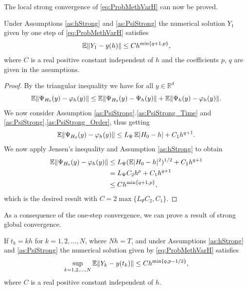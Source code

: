 \documentclass{siamart1116}
\numberwithin{theorem}{section}
\DeclarePairedDelimiter{\abs}{\lvert}{\rvert}
\DeclarePairedDelimiter{\norm}{\|}{\|}
\renewcommand{\phi}{\varphi}
\newcommand{\R}{\mathbb{R}}
\newcommand{\E}{\operatorname{\mathbb{E}}}
\begin{document}
The local strong convergence of \eqref{eq:ProbMethVarH} can now be proved. 
\begin{theorem}\label{thm:StrongOrderLocal} Under Assumptions \ref{as:hStrong} and \ref{as:PsiStrong} the numerical solution $Y_1$ given by one step of \eqref{eq:ProbMethVarH} satisfies 
	\begin{equation}
	\E\norm{Y_1 - y(h)} \leq C h^{\min\{q + 1, p\}},
	\end{equation}
	where $C$ is a real positive constant independent of $h$ and the coefficients $p$, $q$ are given in the assumptions.
\end{theorem}
\begin{proof} By the triangular inequality we have for all $y \in \R^d$ 
	\begin{equation}
		\E\norm{\Psi_{H_0}(y) - \phi_h(y)} \leq \E\norm{\Psi_{H_0}(y) - \Psi_h(y)} + \E\norm{\Psi_h(y) - \phi_h(y)}.
	\end{equation}		
	We now consider Assumption \ref{as:PsiStrong}.\ref{as:PsiStrong_Time} and \ref{as:PsiStrong}.\ref{as:PsiStrong_Order}, thus getting
	\begin{equation}\label{eq:LocalErrorDecomposition}
		\E\norm{\Psi_{H_0}(y) - \phi_h(y)} \leq L_{\Psi} \E\abs{H_0 - h} + C_1 h^{q+1}.
	\end{equation}
	We now apply Jensen's inequality and Assumption \ref{as:hStrong} to obtain
	\begin{equation}
	\begin{aligned}
		\E\norm{\Psi_{H_0}(y) - \phi_h(y)} & \leq L_{\Psi} (\E\abs{H_0 - h}^{2})^{1/2} + C_1 h^{q+1}\\
		&= L_{\Psi}C_2 h^p + C_1 h^{q+1} \\
		&\leq C h^{\min\{q+1, p\}},
	\end{aligned}
	\end{equation}
	which is the desired result with $C = 2\max\{L_\Psi C_2, C_1\}$.
\end{proof}
As a consequence of the one-step convergence, we can prove a result of strong global convergence.
\begin{theorem}\label{thm:StrongOrder} If $t_k = kh$ for $k = 1, 2, \ldots, N$, where $Nh = T$, and under Assumptions \ref{as:hStrong} and \ref{as:PsiStrong} the numerical solution given by \eqref{eq:ProbMethVarH} satisfies 
	\begin{equation}\label{eq:StrongGlobalClaim}
		\sup_{k=1,2, \ldots, N} \E\norm{Y_k - y(t_k)} \leq C h^{\min\{q, p-1/2\}},
	\end{equation}
	where $C$ is a real positive constant independent of $h$. 
\end{theorem}
\end{document}
